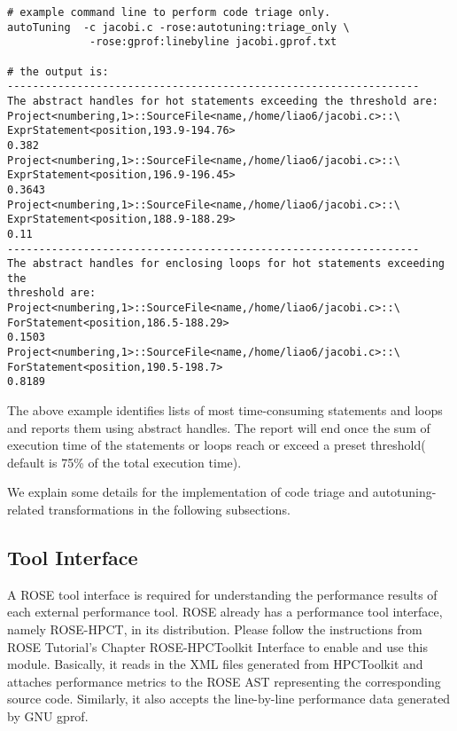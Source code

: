 {\mySmallFontSize
\begin{verbatim}
# example command line to perform code triage only.
autoTuning  -c jacobi.c -rose:autotuning:triage_only \
             -rose:gprof:linebyline jacobi.gprof.txt 

# the output is:
-----------------------------------------------------------------
The abstract handles for hot statements exceeding the threshold are:
Project<numbering,1>::SourceFile<name,/home/liao6/jacobi.c>::\
ExprStatement<position,193.9-194.76>
0.382
Project<numbering,1>::SourceFile<name,/home/liao6/jacobi.c>::\
ExprStatement<position,196.9-196.45>
0.3643
Project<numbering,1>::SourceFile<name,/home/liao6/jacobi.c>::\
ExprStatement<position,188.9-188.29>
0.11
-----------------------------------------------------------------
The abstract handles for enclosing loops for hot statements exceeding the
threshold are:
Project<numbering,1>::SourceFile<name,/home/liao6/jacobi.c>::\
ForStatement<position,186.5-188.29>
0.1503
Project<numbering,1>::SourceFile<name,/home/liao6/jacobi.c>::\
ForStatement<position,190.5-198.7>
0.8189
\end{verbatim}
}

The above example identifies lists of most time-consuming statements and loops and reports them using abstract handles. 
The report will end once the sum of execution time of the statements or
loops reach or exceed a preset threshold( default is 75\% of the total execution time). 

We explain some details for the implementation of code triage and
autotuning-related transformations in the following subsections.
\subsection{Tool Interface}
A ROSE tool interface is required for understanding the performance results of each
external performance tool. 
ROSE already has a performance tool interface, namely ROSE-HPCT,
in its distribution.  Please follow the instructions from ROSE
Tutorial's Chapter ROSE-HPCToolkit Interface to enable and use this module. 
Basically, it
reads in the XML files generated from HPCToolkit and attaches performance metrics to
the ROSE AST representing the corresponding source code. 
Similarly, it also accepts the line-by-line performance data generated by GNU
gprof.

